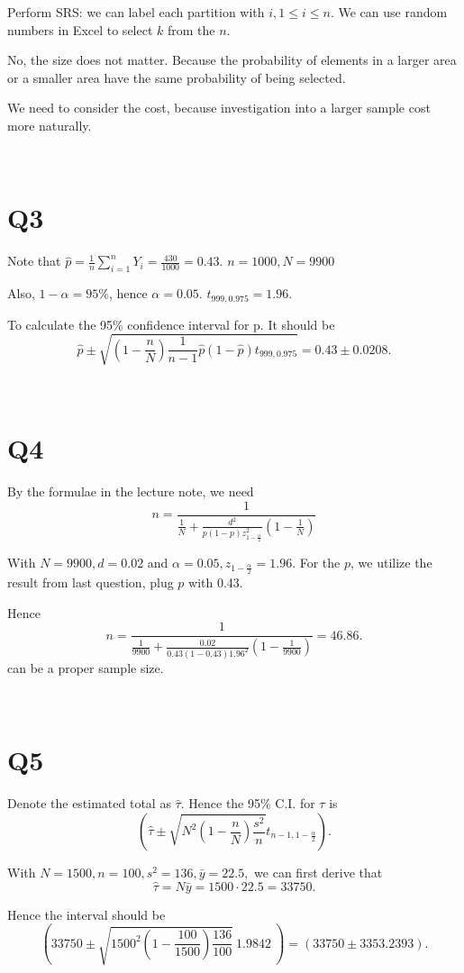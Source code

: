 \documentclass[12pt]{article}%
\begin{document}
Perform SRS: we can label each partition with $i,1\leq i\leq n.$ We can use random numbers in Excel to select $k$ from the $n$.

No, the size does not matter. Because the probability of elements in a larger area or a smaller area have the same probability of being selected.

We need to consider the cost, because investigation into a larger sample cost more naturally.

~\ 

\section{Q3}
Note that $\hat{p}=\frac{1}{n}\sum_{i=1}^{n}Y_i=\frac{430}{1000}=0.43.$ $n=1000,N=9900$

Also, $1-\alpha=95\%$, hence $\alpha=0.05.$ $t_{999,0.975}=1.96.$

To calculate the 95\% confidence interval for p. It should be $$\hat{p}\pm\sqrt{(1-\frac{n}{N})\frac{1}{n-1}\hat{p}(1-\hat{p})t_{999,0.975}}=0.43\pm 0.0208.$$

~\   

\section{Q4}
By the formulae in the lecture note, we need $$n=\frac{1}{\frac{1}{N}+\frac{d^2}{p(1-p)z_{1-\frac{\alpha}{2}}^2}(1-\frac{1}{N})}$$

With $N=9900,d=0.02$ and $\alpha=0.05, z_{1-\frac{\alpha}{2}}=1.96.$ For the $p$, we utilize the result from last question, plug $p$ with 0.43.

Hence $$n=\frac{1}{\frac{1}{9900}+\frac{0.02}{0.43(1-0.43)1.96^2}(1-\frac{1}{9900})}=46.86.$$ can be a proper sample size.

~\ 

\section{Q5}

Denote the estimated total as $\hat{\tau}.$ Hence the 95\% C.I. for $\tau$ is $$(\hat{\tau}\pm \sqrt{N^2(1-\frac{n}{N})\frac{s^2}{n}}t_{n-1,1-\frac{\alpha}{2}}).$$

With $N=1500,n=100,s^2=136,\bar{y}=22.5,$ we can first derive that $$\hat{\tau}=N\bar{y}=1500\cdot 22.5=33750.$$

Hence the interval should be $$(33750\pm \sqrt{1500^2(1-\frac{100}{1500})\frac{136}{100}}~1.9842~)=(33750\pm 3353.2393).$$
\end{document}
